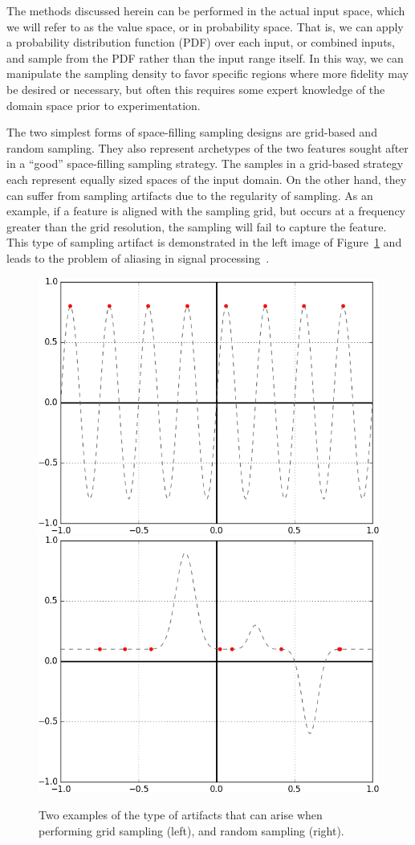 The methods discussed herein can be performed in the actual input space, which we will refer to as the value space, or in probability space.
%
That is, we can apply a probability distribution function (PDF) over each input, or combined inputs, and sample from the PDF rather than the input range itself.
%
In this way, we can manipulate the sampling density to favor specific regions where more fidelity may be desired or necessary, but often this requires some expert knowledge of the domain space prior to experimentation.

The two simplest forms of space-filling sampling designs are grid-based and random sampling.
%
They also represent archetypes of the two features sought after in a ``good'' space-filling sampling strategy.
%
The samples in a grid-based strategy each represent equally sized spaces of the input domain.
%
On the other hand, they can suffer from sampling artifacts due to the regularity of sampling.
%
As an example, if a feature is aligned with the sampling grid, but occurs at a frequency greater than the grid resolution, the sampling will fail to capture the feature.
%
This type of sampling artifact is demonstrated in the left image of Figure~\ref{fig:samplingArtifacts} and leads to the problem of aliasing in signal processing~\cite{Crow1977}.
%

\begin{figure}[b]
  \centering
  \includegraphics[width=.45\textwidth]{figs/chap3/sampledSine}\qquad
  \includegraphics[width=.45\textwidth]{figs/chap3/sampledGaussian}
  \caption[1D Sampling Artifacts]{Two examples of the type of artifacts that can
  arise when performing grid sampling (left), and random sampling (right).}
  \label{fig:samplingArtifacts}
\end{figure}

